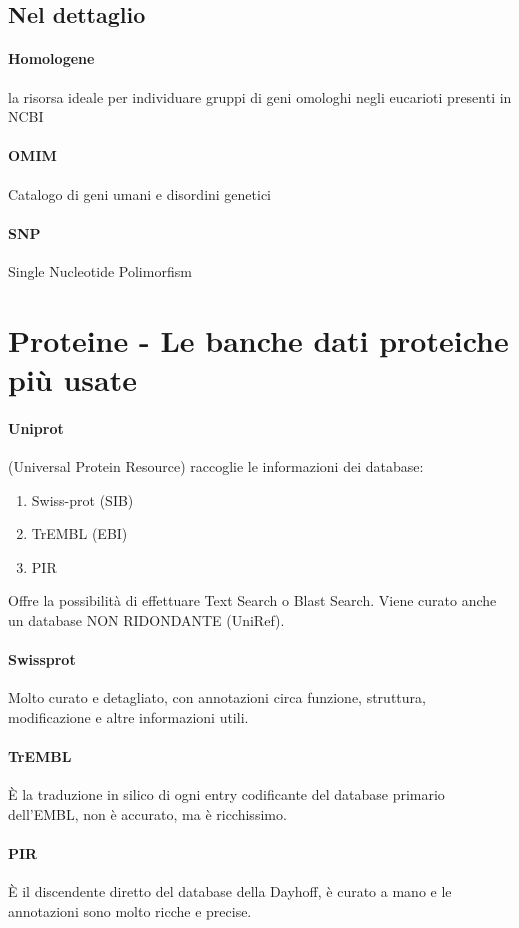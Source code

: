 \documentclass{article}
\begin{document}
\subsection{Nel dettaglio}
\paragraph{Homologene}
la risorsa ideale per individuare gruppi
di geni omologhi negli eucarioti presenti in NCBI
\paragraph{OMIM}
Catalogo di geni umani e disordini genetici
\paragraph{SNP}
Single Nucleotide Polimorfism
\newpage
\section{Proteine - Le banche dati proteiche più usate}
\paragraph{Uniprot}
(Universal Protein Resource) raccoglie le informazioni dei database:
\begin{enumerate}
    \item Swiss-prot (SIB)
    \item TrEMBL (EBI) 
    \item PIR
\end{enumerate} 
Offre la possibilità di effettuare Text
Search o Blast Search. Viene curato anche un database NON RIDONDANTE
(UniRef).
\paragraph{Swissprot}
Molto curato e detagliato, con annotazioni circa funzione, struttura, modificazione e altre informazioni utili.
\paragraph{TrEMBL}
È la traduzione in silico di ogni entry codificante del database primario dell'EMBL, non è accurato, ma è ricchissimo.
\paragraph{PIR}
È il discendente diretto del database della Dayhoff, è curato a mano e le annotazioni sono molto ricche e precise.
\end{document}
